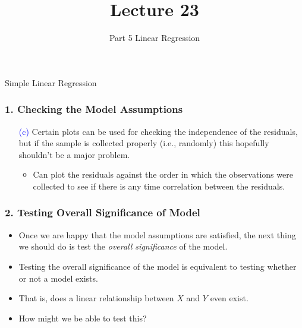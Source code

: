 \documentclass[12pt]{beamer}
\title[ECON2843]{Lecture 23}
\subtitle{Part 5 Linear Regression}
\date{}
\begin{document}
	\begin{frame}
		\titlepage
		
	\end{frame}
	\begin{frame}
		\vspace{1cm}
		\centering
		{\color{blue}\large Simple Linear Regression}
	\end{frame}
	
	


	\begin{frame}
		\frametitle{1. Checking the Model Assumptions}
		
		\begin{itemize}
			\item[\textcolor{blue}{(c)}] Certain plots can be used for checking the independence of the residuals, but if the sample is collected properly (i.e., randomly) this hopefully shouldn't be a major problem.
			\begin{itemize}[label={\color{blue}$\blacktriangleright$}]
				\item Can plot the residuals against the order in which the observations were collected to see if there is any time correlation between the residuals.
			\end{itemize}
		\end{itemize}
		
	\end{frame}
	\begin{frame}
		\frametitle{2. Testing Overall Significance of Model}
		
		\begin{itemize}[label={\color{blue}$\blacktriangleright$}]
			\item Once we are happy that the model assumptions are satisfied, the next thing we should do is test the \textit{overall significance} of the model.
			
			\item Testing the overall significance of the model is equivalent to testing whether or not a model exists.
			
			\item That is, does a linear relationship between $X$ and $Y$ even exist.
			
			\item How might we be able to test this?
		\end{itemize}
		
	\end{frame}
\end{document}
